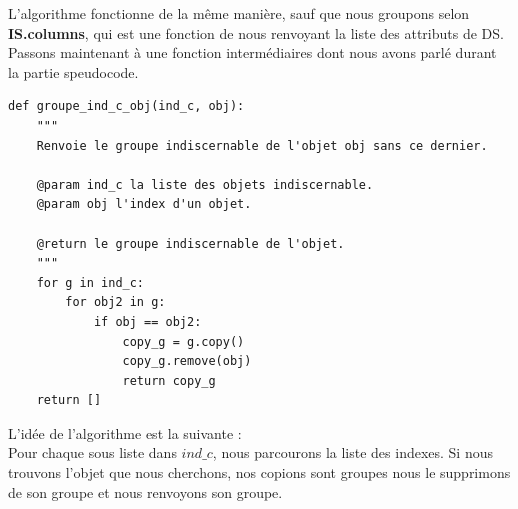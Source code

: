 L'algorithme fonctionne de la même manière, sauf que nous groupons selon
\textbf{IS.columns}, qui est une fonction de \panda nous renvoyant
la liste des attributs de DS. \\
Passons maintenant à une fonction intermédiaires dont nous avons
parlé durant la partie speudocode.
\begin{lstlisting}
def groupe_ind_c_obj(ind_c, obj):
	"""
	Renvoie le groupe indiscernable de l'objet obj sans ce dernier.

	@param ind_c la liste des objets indiscernable.
	@param obj l'index d'un objet.

	@return le groupe indiscernable de l'objet.
	"""
	for g in ind_c:
		for obj2 in g:
			if obj == obj2:
				copy_g = g.copy()
				copy_g.remove(obj)
				return copy_g
	return []
\end{lstlisting}
L'idée de l'algorithme est la suivante : \\
Pour chaque sous liste dans $ind\_c$, nous parcourons la liste des indexes.
Si nous trouvons l'objet que nous cherchons, nos copions sont groupes
nous le supprimons de son groupe et nous renvoyons son groupe. \\
\newpage
